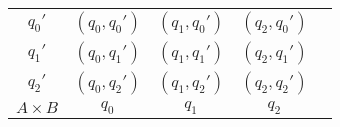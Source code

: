 \begin{table}[H]
\centering
\begin{tabular}{c!{\vrule width 0.8pt}
>{}cc 
>{}cc }
$q_0'$ & $(q_0,q_0')$ & $(q_1,q_0')$ & $(q_2,q_0')$\\
$q_1'$ & $(q_0,q_1')$ & $(q_1,q_1')$ & $(q_2,q_1')$\\
$q_2'$ & $(q_0,q_2')$ & $(q_1,q_2')$ & $(q_2,q_2')$\\
$A\times B$ & $q_0$ & $q_1$ & $q_2$\\
\end{tabular}
\end{table}